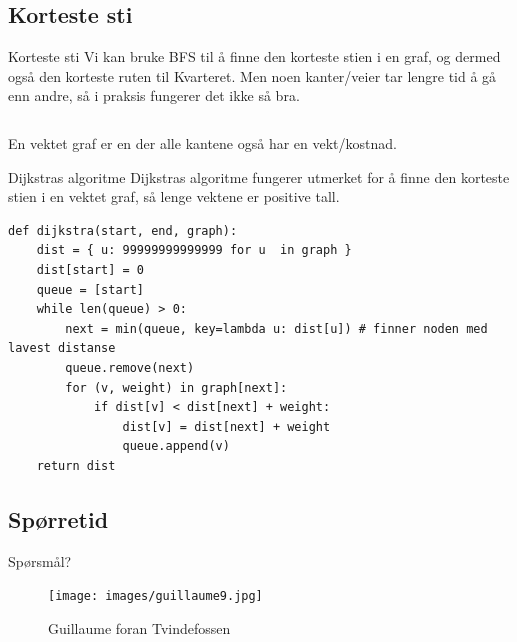 \subsection{Korteste sti}
\begin{frame}[fragile]{Korteste sti}
    Vi kan bruke BFS til å finne den korteste stien i en graf, og dermed også den korteste ruten til Kvarteret. Men noen kanter/veier tar lengre tid å gå enn andre, så i praksis fungerer det ikke så bra.
    \begin{columns}
        \begin{column}{0.48\textwidth}
        \end{column}
        \pause
        \begin{column}{0.48\textwidth}
        \end{column}
    \end{columns}
    \pause
    \begin{definition}
        En vektet graf er en der alle kantene også har en vekt/kostnad.
    \end{definition}
\end{frame}

\begin{frame}[fragile]{Dijkstras algoritme}
    Dijkstras algoritme fungerer utmerket for å finne den korteste stien i en vektet graf, så lenge vektene er positive tall.
    \begin{verbatim}
def dijkstra(start, end, graph):
    dist = { u: 99999999999999 for u  in graph }
    dist[start] = 0
    queue = [start]
    while len(queue) > 0:
        next = min(queue, key=lambda u: dist[u]) # finner noden med lavest distanse
        queue.remove(next)
        for (v, weight) in graph[next]:
            if dist[v] < dist[next] + weight:
                dist[v] = dist[next] + weight
                queue.append(v)
    return dist
    \end{verbatim}
\end{frame}

\subsection*{Spørretid}
\begin{frame}{Spørsmål?}
    \begin{figure}
        \centering
        \texttt{[image: images/guillaume9.jpg]}
        \caption{Guillaume foran Tvindefossen}
        \label{fig:guillaume9}
    \end{figure}
\end{frame}
